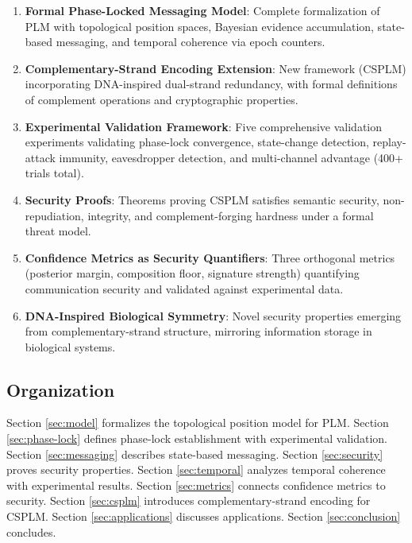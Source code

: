 \documentclass[11pt,a4paper]{article}
\theoremstyle{definition}
\begin{document}
\begin{enumerate}
\item \textbf{Formal Phase-Locked Messaging Model}: Complete formalization of PLM with topological position spaces, Bayesian evidence accumulation, state-based messaging, and temporal coherence via epoch counters.

\item \textbf{Complementary-Strand Encoding Extension}: New framework (CSPLM) incorporating DNA-inspired dual-strand redundancy, with formal definitions of complement operations and cryptographic properties.

\item \textbf{Experimental Validation Framework}: Five comprehensive validation experiments validating phase-lock convergence, state-change detection, replay-attack immunity, eavesdropper detection, and multi-channel advantage (400+ trials total).

\item \textbf{Security Proofs}: Theorems proving CSPLM satisfies semantic security, non-repudiation, integrity, and complement-forging hardness under a formal threat model.

\item \textbf{Confidence Metrics as Security Quantifiers}: Three orthogonal metrics (posterior margin, composition floor, signature strength) quantifying communication security and validated against experimental data.

\item \textbf{DNA-Inspired Biological Symmetry}: Novel security properties emerging from complementary-strand structure, mirroring information storage in biological systems.

\end{enumerate}

\subsection{Organization}

Section \ref{sec:model} formalizes the topological position model for PLM. Section \ref{sec:phase-lock} defines phase-lock establishment with experimental validation. Section \ref{sec:messaging} describes state-based messaging. Section \ref{sec:security} proves security properties. Section \ref{sec:temporal} analyzes temporal coherence with experimental results. Section \ref{sec:metrics} connects confidence metrics to security. Section \ref{sec:csplm} introduces complementary-strand encoding for CSPLM. Section \ref{sec:applications} discusses applications. Section \ref{sec:conclusion} concludes.
\end{document}
